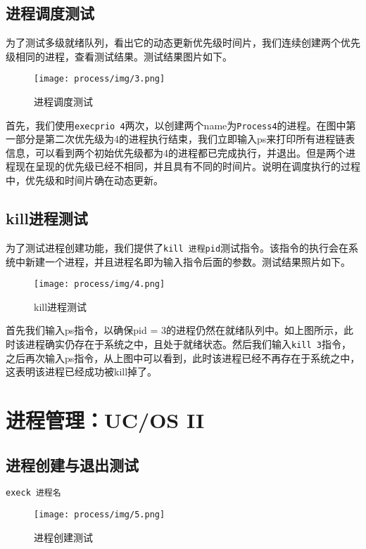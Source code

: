 \subsection{进程调度测试}

为了测试多级就绪队列，看出它的动态更新优先级时间片，我们连续创建两个优先级相同的进程，查看测试结果。测试结果图片如下。

 
\begin{figure}[H]
  \centering
  \texttt{[image: process/img/3.png]}
  \caption{进程调度测试}
\end{figure}


首先，我们使用\texttt{execprio 4}两次，以创建两个name为\texttt{Process4}的进程。在图中第一部分是第二次优先级为4的进程执行结束，我们立即输入ps来打印所有进程链表信息，可以看到两个初始优先级都为4的进程都已完成执行，并退出。但是两个进程现在呈现的优先级已经不相同，并且具有不同的时间片。说明在调度执行的过程中，优先级和时间片确在动态更新。

\subsection{kill进程测试}

为了测试进程创建功能，我们提供了\texttt{kill 进程pid}测试指令。该指令的执行会在系统中新建一个进程，并且进程名即为输入指令后面的参数。测试结果照片如下。

 

\begin{figure}[H]
  \centering
  \texttt{[image: process/img/4.png]}
  \caption{kill进程测试}
\end{figure}

首先我们输入ps指令，以确保pid = 3的进程仍然在就绪队列中。如上图所示，此时该进程确实仍存在于系统之中，且处于就绪状态。然后我们输入\texttt{kill 3}指令，之后再次输入ps指令，从上图中可以看到，此时该进程已经不再存在于系统之中，这表明该进程已经成功被kill掉了。



\section{进程管理：UC/OS II}

\subsection{进程创建与退出测试}

\texttt{execk 进程名}

\begin{figure}[H]
  \centering
  \texttt{[image: process/img/5.png]}
  \caption{进程创建测试}
\end{figure}

